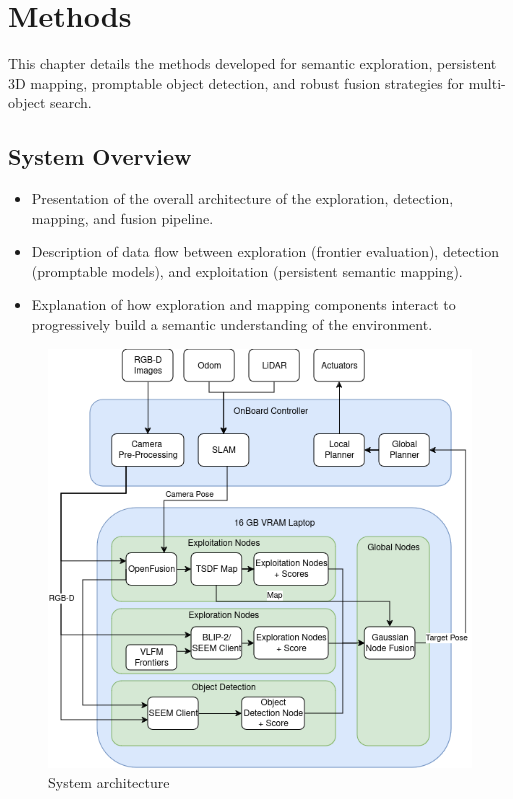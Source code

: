 \chapter{Methods}
This chapter details the methods developed for semantic exploration, persistent 3D mapping, promptable object detection, and robust fusion strategies for multi-object search.

\section{System Overview}
\begin{itemize}
    \item Presentation of the overall architecture of the exploration, detection, mapping, and fusion pipeline.
    \item Description of data flow between exploration (frontier evaluation), detection (promptable models), and exploitation (persistent semantic mapping).
    \item Explanation of how exploration and mapping components interact to progressively build a semantic understanding of the environment.
\end{itemize}

\begin{figure}[h!]
    \centering
    \includegraphics[width=\textwidth]{Images/03_methods/Master_Thesis_Overview.drawio.png}
    \caption{System architecture}
    \label{fig:system_overview}
\end{figure}

